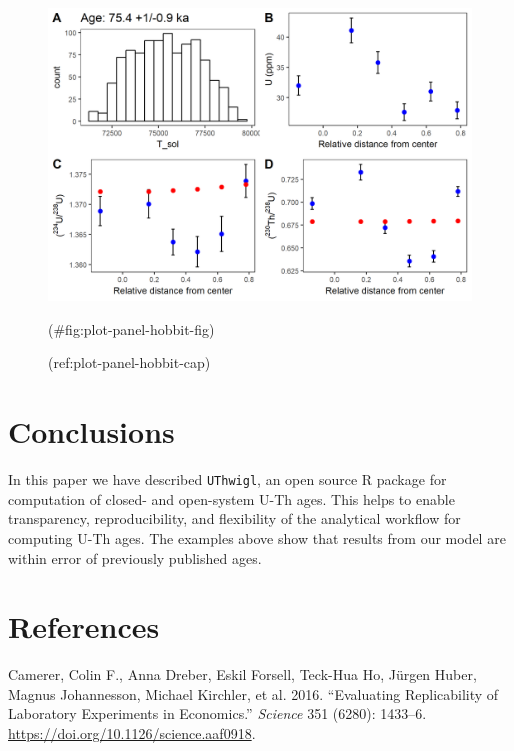 \documentclass[]{elsarticle} %
\begin{document}
\begin{figure}
\includegraphics[width=0.95\linewidth]{figures/plot-panel-hobbit} \caption{(ref:plot-panel-hobbit-cap)}(\#fig:plot-panel-hobbit-fig)
\end{figure}

\FloatBarrier

\hypertarget{conclusions}{%
\section{Conclusions}\label{conclusions}}

In this paper we have described \texttt{UThwigl}, an open source R package for computation of closed- and open-system U-Th ages. This helps to enable transparency, reproducibility, and flexibility of the analytical workflow for computing U-Th ages. The examples above show that results from our model are within error of previously published ages.

\newpage

\nolinenumbers

\hypertarget{references}{%
\section*{References}\label{references}}

\hypertarget{refs}{}
\leavevmode\hypertarget{ref-Camerer1433}{}%
Camerer, Colin F., Anna Dreber, Eskil Forsell, Teck-Hua Ho, Jürgen Huber, Magnus Johannesson, Michael Kirchler, et al. 2016. ``Evaluating Replicability of Laboratory Experiments in Economics.'' \emph{Science} 351 (6280): 1433--6. \url{https://doi.org/10.1126/science.aaf0918}.
\end{document}
